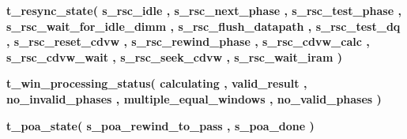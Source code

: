 \begin{DoxyCompactItemize}
\item 
{\bfseries {\bf t\+\_\+resync\+\_\+state}{\bfseries \textcolor{vhdlchar}{(}\textcolor{vhdlchar}{ }\textcolor{vhdlchar}{s\+\_\+rsc\+\_\+idle}\textcolor{vhdlchar}{ }\textcolor{vhdlchar}{,}\textcolor{vhdlchar}{ }\textcolor{vhdlchar}{s\+\_\+rsc\+\_\+next\+\_\+phase}\textcolor{vhdlchar}{ }\textcolor{vhdlchar}{,}\textcolor{vhdlchar}{ }\textcolor{vhdlchar}{s\+\_\+rsc\+\_\+test\+\_\+phase}\textcolor{vhdlchar}{ }\textcolor{vhdlchar}{,}\textcolor{vhdlchar}{ }\textcolor{vhdlchar}{s\+\_\+rsc\+\_\+wait\+\_\+for\+\_\+idle\+\_\+dimm}\textcolor{vhdlchar}{ }\textcolor{vhdlchar}{,}\textcolor{vhdlchar}{ }\textcolor{vhdlchar}{s\+\_\+rsc\+\_\+flush\+\_\+datapath}\textcolor{vhdlchar}{ }\textcolor{vhdlchar}{,}\textcolor{vhdlchar}{ }\textcolor{vhdlchar}{s\+\_\+rsc\+\_\+test\+\_\+dq}\textcolor{vhdlchar}{ }\textcolor{vhdlchar}{,}\textcolor{vhdlchar}{ }\textcolor{vhdlchar}{s\+\_\+rsc\+\_\+reset\+\_\+cdvw}\textcolor{vhdlchar}{ }\textcolor{vhdlchar}{,}\textcolor{vhdlchar}{ }\textcolor{vhdlchar}{s\+\_\+rsc\+\_\+rewind\+\_\+phase}\textcolor{vhdlchar}{ }\textcolor{vhdlchar}{,}\textcolor{vhdlchar}{ }\textcolor{vhdlchar}{s\+\_\+rsc\+\_\+cdvw\+\_\+calc}\textcolor{vhdlchar}{ }\textcolor{vhdlchar}{,}\textcolor{vhdlchar}{ }\textcolor{vhdlchar}{s\+\_\+rsc\+\_\+cdvw\+\_\+wait}\textcolor{vhdlchar}{ }\textcolor{vhdlchar}{,}\textcolor{vhdlchar}{ }\textcolor{vhdlchar}{s\+\_\+rsc\+\_\+seek\+\_\+cdvw}\textcolor{vhdlchar}{ }\textcolor{vhdlchar}{,}\textcolor{vhdlchar}{ }\textcolor{vhdlchar}{s\+\_\+rsc\+\_\+wait\+\_\+iram}\textcolor{vhdlchar}{ }\textcolor{vhdlchar}{)}\textcolor{vhdlchar}{ }}} 
\item 
{\bfseries {\bf t\+\_\+win\+\_\+processing\+\_\+status}{\bfseries \textcolor{vhdlchar}{(}\textcolor{vhdlchar}{ }\textcolor{vhdlchar}{calculating}\textcolor{vhdlchar}{ }\textcolor{vhdlchar}{,}\textcolor{vhdlchar}{ }\textcolor{vhdlchar}{valid\+\_\+result}\textcolor{vhdlchar}{ }\textcolor{vhdlchar}{,}\textcolor{vhdlchar}{ }\textcolor{vhdlchar}{no\+\_\+invalid\+\_\+phases}\textcolor{vhdlchar}{ }\textcolor{vhdlchar}{,}\textcolor{vhdlchar}{ }\textcolor{vhdlchar}{multiple\+\_\+equal\+\_\+windows}\textcolor{vhdlchar}{ }\textcolor{vhdlchar}{,}\textcolor{vhdlchar}{ }\textcolor{vhdlchar}{no\+\_\+valid\+\_\+phases}\textcolor{vhdlchar}{ }\textcolor{vhdlchar}{)}\textcolor{vhdlchar}{ }}} 
\item 
{\bfseries {\bf t\+\_\+poa\+\_\+state}{\bfseries \textcolor{vhdlchar}{(}\textcolor{vhdlchar}{ }\textcolor{vhdlchar}{s\+\_\+poa\+\_\+rewind\+\_\+to\+\_\+pass}\textcolor{vhdlchar}{ }\textcolor{vhdlchar}{,}\textcolor{vhdlchar}{ }\textcolor{vhdlchar}{s\+\_\+poa\+\_\+done}\textcolor{vhdlchar}{ }\textcolor{vhdlchar}{)}\textcolor{vhdlchar}{ }}} 

\end{DoxyCompactItemize}
